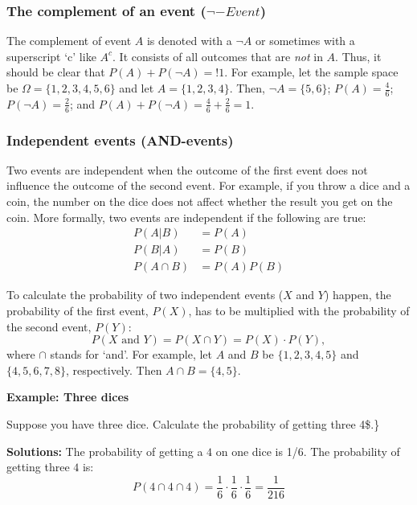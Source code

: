 \documentclass[
  12pt,
  oneside]{book}
\theoremstyle{definition}
\theoremstyle{definition}
\theoremstyle{definition}
\theoremstyle{definition}
\theoremstyle{remark}
\begin{document}
\hypertarget{the-complement-of-an-event-neg-event}{%
\subsubsection{\texorpdfstring{The complement of an event (\(\neg-Event\))}{The complement of an event (\textbackslash neg-Event)}}\label{the-complement-of-an-event-neg-event}}

The complement of event \(A\) is denoted with a \(\neg A\) or sometimes with a superscript `c' like \(A^c\).
It consists of all outcomes that are \emph{not} in \(A\). Thus, it should be clear that \(P(A) + P(\neg A) =! 1\).
For example, let the sample space be \(\Omega = \{1, 2, 3, 4, 5, 6\}\) and let \(A = \{1, 2, 3, 4\}\).
Then, \(\neg A = \{5, 6\}\); \(P(A) = \frac{4}{6}\); \(P(\neg A) = \frac{2}{6}\); and \(P(A) + P(\neg A) = \frac{4}{6}+\frac{2}{6} = 1\).

\hypertarget{independent-events-and-events}{%
\subsubsection{Independent events (AND-events)}\label{independent-events-and-events}}

Two events are independent when the outcome of the first event does not influence the outcome of the second event.
For example, if you throw a dice and a coin, the number on the dice does not affect whether the result you get on the coin.
More formally, two events are independent if the following are true:
\begin{align*}
    P(A|B) &= P(A)\\
    P(B|A) &= P(B)\\
    P(A \cap B) &= P(A)P(B)
\end{align*}

To calculate the probability of two independent events (\(X\) and \(Y\)) happen, the probability of the first event, \(P(X)\), has to be multiplied with the probability of the second event, \(P(Y)\):
\[ P(X \text{ and } Y)=P(X \cap Y)=P(X)\cdot P(Y),\]
where \(\cap\) stands for `and'.
For example, let \(A\) and \(B\) be \(\{1, 2, 3, 4, 5\}\) and \(\{4, 5, 6, 7, 8\}\), respectively. Then \(A \cap B = \{4, 5\}\).

\textbf{Example: Three dices}

Suppose you have three dice. Calculate the probability of getting three 4\$.\}

\textbf{Solutions:}
The probability of getting a \(4\) on one dice is 1/6. The probability of getting three \(4\) is:
\[
P(4 \cap 4 \cap 4) = \frac{1}{6}\cdot \frac{1}{6}\cdot \frac{1}{6}= \frac{1}{216}
\]
\end{document}
